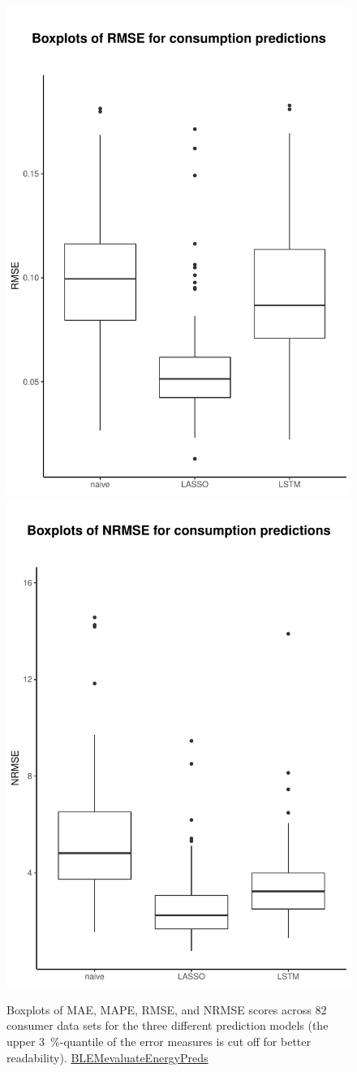 \begin{figure}
    \includegraphics[width=.5\textwidth-5pt]{thesis/graphs/evaluation/c_boxplot_RMSE.pdf}
    \includegraphics[width=.5\textwidth-5pt]{thesis/graphs/evaluation/c_boxplot_NRMSE.pdf} \\
    \caption[Boxplots of MAE, MAPE, RMSE, and NRMSE scores across consumer data sets]{Boxplots of MAE, MAPE, RMSE, and NRMSE scores across 82 consumer data sets for the three different prediction models (the upper 3~\%-quantile of the error measures is cut off for better readability). \quantnet\href{}{BLEMevaluateEnergyPreds}}
    \label{Fig:boxplots_errormeasures}
\end{figure}
%

